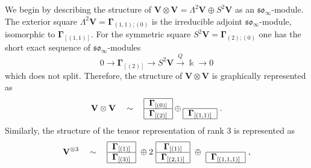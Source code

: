 \documentclass[12pt,reqno]{amsart}
\numberwithin{equation}{section}
\theoremstyle{plain}
\theoremstyle{definition}
\def\so{\mathfrak{so}}
\def\o{\otimes}
\def\glV_#1{\boldsymbol\Gamma_{#1}}
\def\soV_#1{\boldsymbol\Gamma_{[#1]}}
\def\VV{\mathbf V}
\begin{document}
We begin by describing the structure of $\VV \o \VV = \Lambda^2 \VV
\oplus S^2 \VV$ as an $\so_\infty$-module. The exterior square $\Lambda^2 \VV =
\glV_{(1,1);(0)}$ is the irreducible adjoint $\so_\infty$-module, isomorphic to $\soV_{(1,1)}$. For the symmetric square $S^2 \VV =
\glV_{(2);(0)}$ one has the short exact sequence of
$\so_\infty$-modules
\begin{equation*}
    0 \to \soV_{(2)} \to S^2 \VV \overset Q\to \Bbbk \to 0
\end{equation*}
which does not split. Therefore, the structure of $\VV \o \VV$ is
graphically represented as
\begin{equation*}
    \VV\o \VV \quad\sim\quad
    \begin{tabular}{|c|}
        \hline
        $\soV_{(0)}$\\
        \hline
        $\soV_{(2)}$\\
        \hline
    \end{tabular}
    \oplus
    \begin{tabular}{|c|}
        \multicolumn{1}{r}{ }\\
        \hline
        $\soV_{(1,1)}$\\
        \hline
    \end{tabular} \ .
\end{equation*}
\bigskip
Similarly, the structure of the tensor representation of rank 3 is
represented as
\begin{equation*}
    \VV^{\o3} \quad\sim\quad
    \begin{tabular}{|c|}
        \hline
        $\soV_{(1)}$\\
        \hline
        $\soV_{(3)}$\\
        \hline
    \end{tabular}
    \ \oplus 2 \
    \begin{tabular}{|c|}
        \hline
        $\soV_{(1)}$\\
        \hline
        $\soV_{(2,1)}$\\
        \hline
    \end{tabular}
    \ \oplus \
    \begin{tabular}{|c|}
        \multicolumn{1}{c}{ }\\
        \hline
        $\soV_{(1,1,1)}$\\
        \hline
    \end{tabular}\ ,
\end{equation*}
\end{document}
